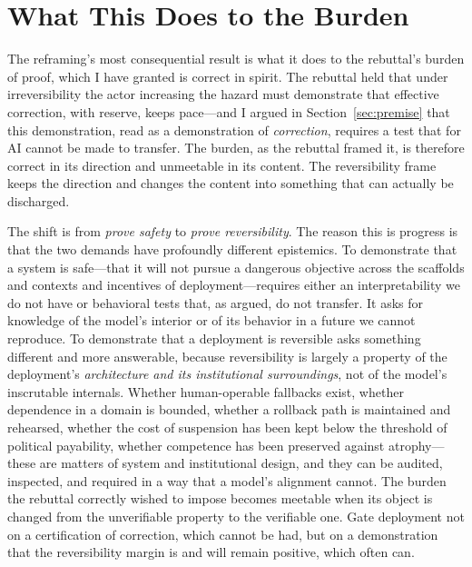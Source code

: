 \documentclass[11pt]{article}
\begin{document}
\section{What This Does to the Burden}
\label{sec:burden}

The reframing's most consequential result is what it does to the rebuttal's burden of proof, which I have granted is correct in spirit. The rebuttal held that under irreversibility the actor increasing the hazard must demonstrate that effective correction, with reserve, keeps pace---and I argued in Section~\ref{sec:premise} that this demonstration, read as a demonstration of \emph{correction}, requires a test that for AI cannot be made to transfer. The burden, as the rebuttal framed it, is therefore correct in its direction and unmeetable in its content. The reversibility frame keeps the direction and changes the content into something that can actually be discharged.

The shift is from \emph{prove safety} to \emph{prove reversibility}. The reason this is progress is that the two demands have profoundly different epistemics. To demonstrate that a system is safe---that it will not pursue a dangerous objective across the scaffolds and contexts and incentives of deployment---requires either an interpretability we do not have or behavioral tests that, as argued, do not transfer. It asks for knowledge of the model's interior or of its behavior in a future we cannot reproduce. To demonstrate that a deployment is reversible asks something different and more answerable, because reversibility is largely a property of the deployment's \emph{architecture and its institutional surroundings}, not of the model's inscrutable internals. Whether human-operable fallbacks exist, whether dependence in a domain is bounded, whether a rollback path is maintained and rehearsed, whether the cost of suspension has been kept below the threshold of political payability, whether competence has been preserved against atrophy---these are matters of system and institutional design, and they can be audited, inspected, and required in a way that a model's alignment cannot. The burden the rebuttal correctly wished to impose becomes meetable when its object is changed from the unverifiable property to the verifiable one. Gate deployment not on a certification of correction, which cannot be had, but on a demonstration that the reversibility margin is and will remain positive, which often can.
\end{document}
